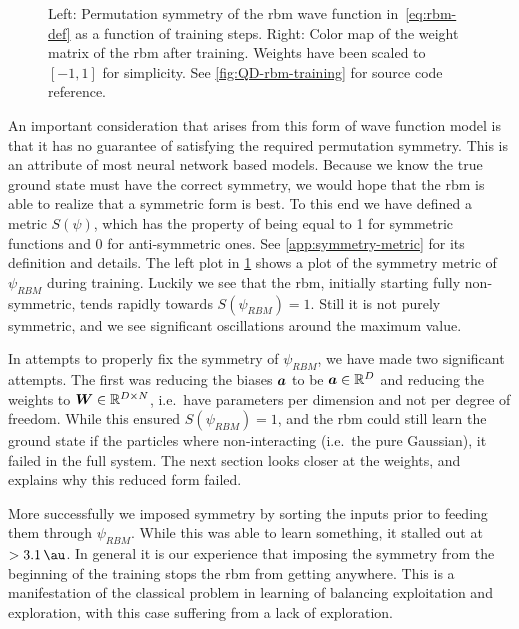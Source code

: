 \documentclass[Thesis.tex]{subfiles}
\begin{document}
\begin{figure}[h]
   \centering
    \resizebox{\linewidth}{!}{%
        
    }
    \caption[Symmetry and weight matrix of an \acrshort{rbm} used on quantum dots]{\label{fig:QD-rbm-symmetry}Left: Permutation symmetry of the \gls{rbm} wave
function in~\cref{eq:rbm-def} as a function of training steps. Right: Color map
of the weight matrix of the \gls{rbm} after training. Weights have been scaled to
$[-1, 1]$ for simplicity. See \cref{fig:QD-rbm-training} for source code reference.}
\end{figure}

An important consideration that arises from this form of wave function model
is that it has no guarantee of satisfying the required permutation symmetry.
This is an attribute of most neural network based models. Because we know the
true ground state must have the correct symmetry, we would hope that the \gls{rbm} is
able to realize that a symmetric form is best. To this end we have defined a
metric $S(\psi)$, which has the property of being equal to 1 for symmetric
functions and $0$ for anti-symmetric ones. See \cref{app:symmetry-metric} for
its definition and details. The left plot in \cref{fig:QD-rbm-symmetry} shows a
plot of the symmetry metric of $\psi_{RBM}$ during training. Luckily we see
that the \gls{rbm}, initially starting fully non-symmetric, tends rapidly towards
$S(\psi_{RBM})=1$. Still it is not purely symmetric, and we see significant
oscillations around the maximum value.


In attempts to properly fix the symmetry of $\psi_{RBM}$, we have made two
significant attempts. The first was reducing the biases $\bm{a}$ to be $\bm{a}\in\mathbb{R}^D$ and reducing the weights to $\bm{W}\in\mathbb{R}^{D\times N}$,
i.e.\ have parameters per dimension and not per degree of freedom. While this ensured
$S(\psi_{RBM})=1$, and the \gls{rbm} could still learn the ground state if the
particles where non-interacting (i.e.\ the pure Gaussian), it failed in the full
system. The next section looks closer at the weights, and explains why this
reduced form failed.

More successfully we imposed symmetry by sorting the inputs prior to feeding
them through $\psi_{RBM}$. While this was able to learn something, it stalled
out at $>\SI{3.1}{\au}$. In general it is our experience that imposing the
symmetry from the beginning of the training stops the \gls{rbm} from getting anywhere.
This is a manifestation of the classical problem in learning of balancing
exploitation and exploration, with this case suffering from a lack of exploration.
\end{document}
